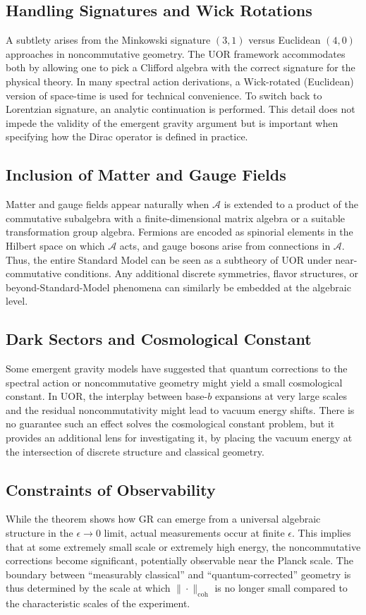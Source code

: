 \documentclass[11pt]{article}
\begin{document}
\subsection{Handling Signatures and Wick Rotations}
A subtlety arises from the Minkowski signature $(3,1)$ versus Euclidean $(4,0)$ approaches in noncommutative geometry. The UOR framework accommodates both by allowing one to pick a Clifford algebra with the correct signature for the physical theory. In many spectral action derivations, a Wick-rotated (Euclidean) version of space-time is used for technical convenience. To switch back to Lorentzian signature, an analytic continuation is performed. This detail does not impede the validity of the emergent gravity argument but is important when specifying how the Dirac operator is defined in practice.

\subsection{Inclusion of Matter and Gauge Fields}
Matter and gauge fields appear naturally when $\mathcal{A}$ is extended to a product of the commutative subalgebra with a finite-dimensional matrix algebra or a suitable transformation group algebra. Fermions are encoded as spinorial elements in the Hilbert space on which $\mathcal{A}$ acts, and gauge bosons arise from connections in $\mathcal{A}$. Thus, the entire Standard Model can be seen as a subtheory of UOR under near-commutative conditions. Any additional discrete symmetries, flavor structures, or beyond-Standard-Model phenomena can similarly be embedded at the algebraic level.

\subsection{Dark Sectors and Cosmological Constant}
Some emergent gravity models have suggested that quantum corrections to the spectral action or noncommutative geometry might yield a small cosmological constant. In UOR, the interplay between base-$b$ expansions at very large scales and the residual noncommutativity might lead to vacuum energy shifts. There is no guarantee such an effect solves the cosmological constant problem, but it provides an additional lens for investigating it, by placing the vacuum energy at the intersection of discrete structure and classical geometry.

\subsection{Constraints of Observability}
While the theorem shows how GR can emerge from a universal algebraic structure in the $\epsilon \to 0$ limit, actual measurements occur at finite $\epsilon$. This implies that at some extremely small scale or extremely high energy, the noncommutative corrections become significant, potentially observable near the Planck scale. The boundary between “measurably classical” and “quantum-corrected” geometry is thus determined by the scale at which $\|\cdot\|_{\mathrm{coh}}$ is no longer small compared to the characteristic scales of the experiment.
\end{document}
